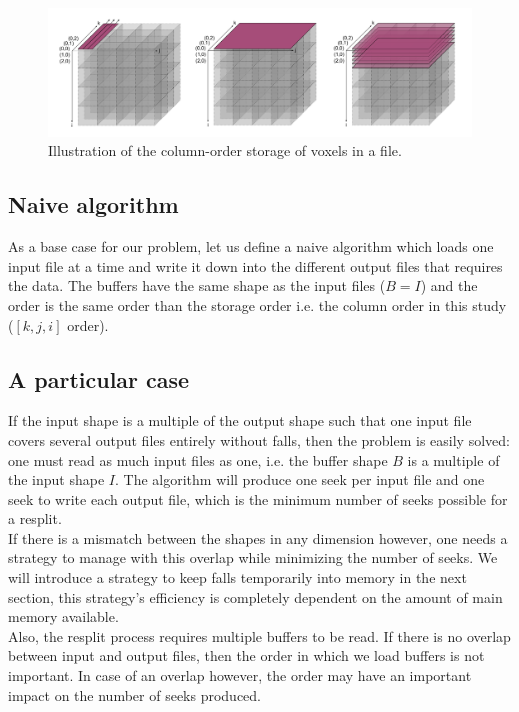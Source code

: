 \documentclass[conference]{IEEEtran}
\begin{document}
\begin{figure}[h!]
\centering
\includegraphics[scale=0.2]{./figures/column_order.png}
\caption{Illustration of the column-order storage of voxels in a file.
}
\label{fig:column_order}
\end{figure}

\subsection{Naive algorithm}

As a base case for our problem, let us define a naive algorithm which loads one input file at a time and write it down into the different output files that requires the data.
The buffers have the same shape as the input files ($B=I$) and the order is the same order than the storage order i.e. the column order in this study ($[k, j, i]$ order).

\subsection{A particular case}

If the input shape is a multiple of the output shape such that one input file covers several output files entirely without falls, then the problem is easily solved: one must read as much input files as one, i.e. the buffer shape $B$ is a multiple of the input shape $I$.
The algorithm will produce one seek per input file and one seek to write each output file, which is the minimum number of seeks possible for a resplit.\\

If there is a mismatch between the shapes in any dimension however, one needs a strategy to manage with this overlap while minimizing the number of seeks.
We will introduce a strategy to keep falls temporarily into memory in the next section, this strategy's efficiency is completely dependent on the amount of main memory available. \\

Also, the resplit process requires multiple buffers to be read.
If there is no overlap between input and output files, then the order in which we load buffers is not important.
In case of an overlap however, the order may have an important impact on the number of seeks produced.
\end{document}
